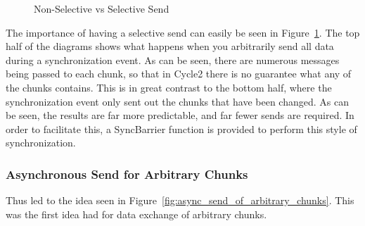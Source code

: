 \documentclass[../thesis.tex]{subfiles}
\begin{document}
\begin{figure}[htbp]

      \caption{Non-Selective vs Selective Send}
      \label{fig:selective_send}
    \end{figure}

    The importance of having a selective send can easily be seen in Figure~\ref{fig:selective_send}. The top half of the diagrams shows what happens when you arbitrarily send all data during a synchronization event. As can be seen, there are numerous messages being passed to each chunk, so that in Cycle2 there is no guarantee what any of the chunks contains. This is in great contrast to the bottom half, where the synchronization event only sent out the chunks that have been changed. As can be seen, the results are far more predictable, and far fewer sends are required. In order to facilitate this, a SyncBarrier function is provided to perform this style of synchronization.


  \subsubsection{Asynchronous Send for Arbitrary Chunks} %
  \label{ssub:asynchronous_send_for_arbitrary_chunks}
   

    Thus led to the idea seen in Figure~\ref{fig:async_send_of_arbitrary_chunks}. This was the first idea had for data exchange of arbitrary chunks.
\end{document}
